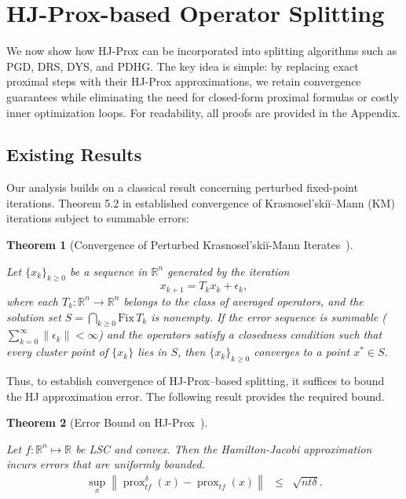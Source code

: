 \documentclass{article}
\newcommand{\Real}{\mathbb{R}}
\newcommand{\prox}{\operatorname{prox}}
\newcommand{\hjprox}{\operatorname{prox}^{\delta}}
\theoremstyle{plain}
\newtheorem{theorem}{Theorem}[section]
\theoremstyle{definition}
\theoremstyle{remark}
\begin{document}
\section{HJ-Prox-based Operator Splitting}
We now show how HJ-Prox can be incorporated into splitting algorithms such as PGD, DRS, DYS, and PDHG. The key idea is simple: by replacing exact proximal steps with their HJ-Prox approximations, we retain convergence guarantees while eliminating the need for closed-form proximal formulas or costly inner optimization loops. For readability, all proofs are provided in the Appendix. 
\subsection{Existing Results}
Our analysis builds on a classical result concerning perturbed fixed-point iterations. Theorem 5.2 in \cite{Combettes2001} established convergence of Krasnosel’skiĭ–Mann (KM) iterations subject to summable errors:
\newcommand{\perturbedKMTheorem}[1]{
    Let $\{x_k\}_{k\geq0}$ be a sequence in $\mathbb{R}^n$ generated by the iteration
    \begin{equation}
        x_{k+1} = T_k x_k + \epsilon_k,
    \end{equation}
    where each $T_k \colon \mathbb{R}^n \to \mathbb{R}^n$ belongs to the class of averaged operators, and the solution set $S = \bigcap_{k \geq 0} \mathrm{Fix}\, T_k$ is nonempty. If the error sequence is summable ($\sum_{k=0}^{\infty} \|\epsilon_k\| < \infty$) and the operators satisfy a closedness condition such that every cluster point of $\{x_k\}$ lies in $S$, then $\{x_k\}_{k\geq0}$ converges to a point $x^* \in S$.
}
 \begin{theorem}[Convergence of Perturbed Krasnosel'skiĭ-Mann Iterates~\cite{Combettes2001}]
    \label{theorem:perturbed_KM}
    \perturbedKMTheorem{main}
\end{theorem}

Thus, to establish convergence of HJ-Prox–based splitting, it suffices to bound the HJ approximation error. The following result provides the required bound.

\newcommand{\hjproxerrorTheorem}[1]{
Let $f : \Real^n \mapsto \Real$ be LSC and convex. Then the Hamilton-Jacobi approximation incurs errors that are uniformly bounded.
    \begin{eqnarray}
    \sup_{x} \left\|\hjprox_{tf}(x) - \prox_{tf}(x)\right\| & \leq & \sqrt{n t \delta}.
    \end{eqnarray}
}
\begin{theorem}[Error Bound on HJ-Prox~\cite{crandall1983viscosity}]
\label{thm:hj_prox_error_bound}
\hjproxerrorTheorem{main}
\end{theorem}
\end{document}
